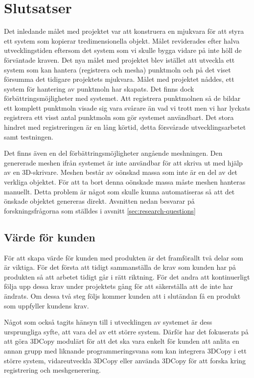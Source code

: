 \chapter{Slutsatser}
\label{cha:conclusion}
Det inledande målet med projektet var att konstruera en mjukvara för att styra ett system som kopierar tredimensionella objekt. Målet reviderades efter halva utvecklingstiden eftersom det system som vi skulle bygga vidare på inte höll de förväntade kraven. Det nya målet med projektet blev istället att utveckla ett system som kan hantera (registrera och mesha) punktmoln och på det viset försumma det tidigare projektets mjukvara. Målet med projektet nåddes, ett system för hantering av punktmoln har skapats. Det finns dock förbättringsmöjligheter med systemet. Att registrera punktmolnen så de bildar ett komplett punktmoln visade sig vara svårare än vad vi trott men vi har lyckats registrera ett visst antal punktmoln som gör systemet användbart. Det stora hindret med registreringen är en lång körtid, detta försvårade utvecklingsarbetet samt testningen. 

Det finns även en del förbättringsmöjligheter angående meshningen. Den genererade meshen ifrån systemet är inte användbar för att skriva ut med hjälp av en 3D-skrivare. Meshen består av oönskad massa som inte är en del av det verkliga objektet. För att ta bort denna oönskade massa måste meshen hanteras manuellt. Detta problem är något som skulle kunna automatiseras så att det önskade objektet genereras direkt. Avsnitten nedan besvarar på forskningsfrågorna som ställdes i avsnitt \ref{sec:research-questions}

\section{Värde för kunden}

För att skapa värde för kunden med produkten är det framförallt två delar som är viktiga. För det första att tidigt sammanställa de krav som kunden har på produkten så att arbetet tidigt går i rätt riktning. För det andra att kontinuerligt följa upp dessa krav under projektets gång för att säkerställa att de inte har ändrats. Om dessa två steg följs kommer kunden att i slutändan få en produkt som uppfyller kundens krav.

Något som också tagits hänsyn till i utvecklingen av systemet är dess ursprungliga syfte, att vara del av ett större system. Därför har det fokuserats på att göra 3DCopy modulärt för att det ska vara enkelt för kunden att anlita en annan grupp med liknande programmeringsvana som kan integrera 3DCopy i ett större system, vidareutveckla 3DCopy eller använda 3DCopy för att forska kring registrering och meshgenerering.

